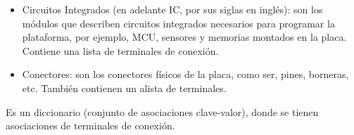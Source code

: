 \begin{itemize}
\item
Circuitos Integrados (en adelante IC, por sus siglas en inglés): son los módulos que describen circuitos integrados necesarios para programar la plataforma, por ejemplo, MCU, sensores y memorias montados en la placa. Contiene una lista de terminales de conexión. 
\item
Conectores: son los conectores físicos de la placa, como ser, pines, borneras, etc. También contienen un alista de terminales.
\end{itemize}



Es un diccionario (conjunto de asociaciones clave-valor), donde se tienen asociaciones de terminales de conexión. 
